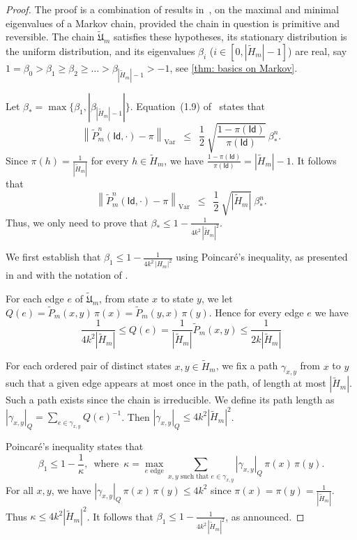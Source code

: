 \documentclass{article}
\def\Id{\textsf{Id}}
\def\tU{\tilde{\mathfrak{U}}}
\def\tH{\tilde{H}}
\def\tP{\tilde{P}}
\theoremstyle{plain}
\theoremstyle{definition}
\begin{document}
\begin{proof}
%
The proof is a combination of results in~\cite{diaconis1991geometric}, on the maximal and minimal eigenvalues of a Markov chain, provided the chain in question is primitive and reversible. The chain $\tU_m$ satisfies these hypotheses, its stationary distribution is the uniform distribution, and its eigenvalues $\beta_i$ ($i \in [0, |\tH_m|-1]$) are real, say $1=\beta_0>\beta_1\geq \beta_2\geq\ldots > \beta_{|\tH_m|-1} > -1$, see \cref{thm: basics on Markov}.

Let $\beta_* = \max\{\beta_1,|\beta_{|\tH_m|-1}|\}$. 
Equation~(1.9) of~\cite[Prop. 3]{diaconis1991geometric} states that
%
$$\left\| \tP_m^n(\Id,\cdot) - \pi \right\|_{\text{Var}} \enspace\le\enspace \frac12\ \sqrt{\frac{1-\pi(\Id)}{\pi(\Id)}}\ \beta_*^n.$$
%
Since 
$\pi(h) = \frac1{|\tH_m|}$ for every $h\in \tH_m$, we have $\frac{1-\pi(\Id)}{\pi(\Id)} = |\tH_m|-1$. It follows that
%
\[
\left\| \tP_m^n(\Id,\cdot) - \pi \right\|_{\text{Var}} \enspace\le\enspace \frac12\ \sqrt{|\tH_m|}\ \beta_*^n.
\]
%
Thus, we only need to prove that $\beta_*\leq 1-\frac1{4k^2\,|\tH_m|^2}$.

We first establish that $\beta_1\leq 1-\frac1{4k^2\,|H_m|^2}$ using Poincaré's inequality, as presented in and with the notation of \cite[Prop. 1]{diaconis1991geometric}. 

For each edge $e$ of $\tU_m$, from state $x$ to state $y$, we let $Q(e) = \tP_m(x,y)\, \pi(x) = \tP_m(y,x)\, \pi(y)$. Hence for every edge $e$ we have
\[
\frac1{4k^2|\tH_m|}\leq Q(e) = \frac1{|\tH_m|}\tP_m(x,y) \leq \frac1{2k|\tH_m|}
\]


For each ordered pair of distinct states $x,y\in \tH_m$, we fix a path $\gamma_{x,y}$ from $x$ to $y$ such that a given edge appears at most once in the path, of length at most $|\tH_m|$.
Such  a path exists since the chain is irreducible.
We define its path length as $|\gamma_{x,y}|_Q = \sum_{e \in \gamma_{x,y}} Q(e)^{-1}$.
Then  $|\gamma_{x,y}|_Q \le 4k^2|\tH_m|^2$.

Poincaré's inequality \cite[Prop. 1]{diaconis1991geometric}  states that
%
$$\beta_1 \le 1 - \frac1\kappa,\enspace\textrm{where}\enspace\kappa = \max_{e\text{ edge}}\sum_{x,y\textrm{ such that }e\in \gamma_{x,y}}|\gamma_{x,y}|_Q \,\pi(x)\,\pi(y).$$ 
%
For all $x,y$, we have $|\gamma_{x,y}|_Q\, \pi(x)\,\pi(y) \le 4k^2$ since $\pi(x)=\pi(y)= \frac1{|\tH_m|}$. Thus $\kappa \le 4k^2|\tH_m|^2$. It follows that $\beta_1\leq 1-\frac1{4k^2\,|\tH_m|^2}$, as announced.


\end{proof}
\end{document}
